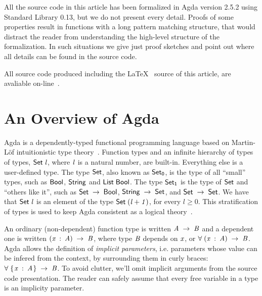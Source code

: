 \documentclass[sigplan, anonymous, review]{acmart}
\renewcommand{\geq}{\geqslant}
\theoremstyle{definition}
\newcommand{\D}[1]{\blue{\mathsf{#1}}}
\newcommand{\V}[1]{\purple{\mathit{#1}}}
\begin{document}
All the source code in this article has been formalized in Agda
version 2.5.2 using Standard Library 0.13, but
we do not present every detail. Proofs of some properties result in
functions with a long pattern matching structure, that would distract
the reader from understanding the high-level structure of the
formalization. In such situations we give just proof sketches and point
out where all details can be found in the source code.

All source code produced including
the \LaTeX~ source of this article, are avaliable
on-line~\cite{regex-rep}.


\section{An Overview of Agda}\label{sec:agda}

Agda is a dependently-typed functional programming language based on
Martin-L\"of intuitionistic type theory~\cite{Lof98}.  Function types
and an infinite hierarchy of types of types, \ensuremath{\D{Set}\;\V{l}}, where \ensuremath{\V{l}} is a
natural number, are built-in. Everything else is a user-defined
type. The type \ensuremath{\D{Set}}, also known as \ensuremath{\D{Set}_{\D{0}}}, is the type of all
``small'' types, such as \ensuremath{\D{Bool}}, \ensuremath{\D{String}} and \ensuremath{\D{List}\;\D{Bool}}.  The type
\ensuremath{\D{Set}_{\D{1}}} is the type of \ensuremath{\D{Set}} and ``others like it'', such as \ensuremath{\D{Set}\;\to \;\D{Bool}}, \ensuremath{\D{String}\;\to \;\D{Set}}, and \ensuremath{\D{Set}\;\to \;\D{Set}}. We have that \ensuremath{\D{Set}\;\V{l}} is an
element of the type \ensuremath{\D{Set}\;(\V{l+1})}, for every $l \geq 0$. This
stratification of types is used to keep Agda consistent as a logical
theory~\cite{Sorensen2006}.

An ordinary (non-dependent) function type is written \ensuremath{\V{A}\;\to \;\V{B}} and a
dependent one is written \ensuremath{(\V{x}\;\mathbin{:}\;\V{A})\;\to \;\V{B}}, where type \ensuremath{\V{B}} depends on
\ensuremath{\V{x}}, or \ensuremath{\D{\forall}\;(\V{x}\;\mathbin{:}\;\V{A})\;\to \;\V{B}}. Agda allows the definition of \emph{implicit
parameters}, i.e.  parameters whose value can be infered from the
context, by surrounding them in curly braces: \ensuremath{\D{\forall}\;\{\mskip1.5mu \V{x}\;\mathbin{:}\;\V{A}\mskip1.5mu\}\;\to \;\V{B}}. To
avoid clutter, we'll omit implicit arguments from the source code
presentation. The reader can safely assume that every free variable in
a type is an implicity parameter.
\end{document}
